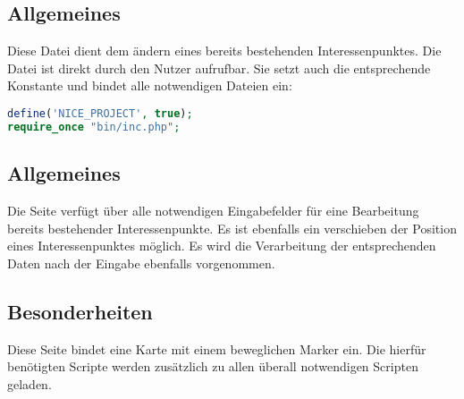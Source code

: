\subsection{Allgemeines} Diese Datei dient dem ändern eines bereits bestehenden Interessenpunktes.
Die Datei ist direkt durch den Nutzer aufrufbar. Sie setzt auch die entsprechende Konstante und bindet alle notwendigen Dateien ein:
\begin{lstlisting}[language=php]
define('NICE_PROJECT', true);
require_once "bin/inc.php";
\end{lstlisting}
\subsection{Allgemeines}
Die Seite verfügt über alle notwendigen Eingabefelder für eine Bearbeitung bereits bestehender Interessenpunkte. Es ist ebenfalls ein verschieben der Position eines Interessenpunktes möglich. Es wird die Verarbeitung der entsprechenden Daten nach der Eingabe ebenfalls vorgenommen.
\subsection{Besonderheiten}
Diese Seite bindet eine Karte mit einem beweglichen Marker ein. Die hierfür benötigten Scripte werden zusätzlich zu allen überall notwendigen Scripten geladen.